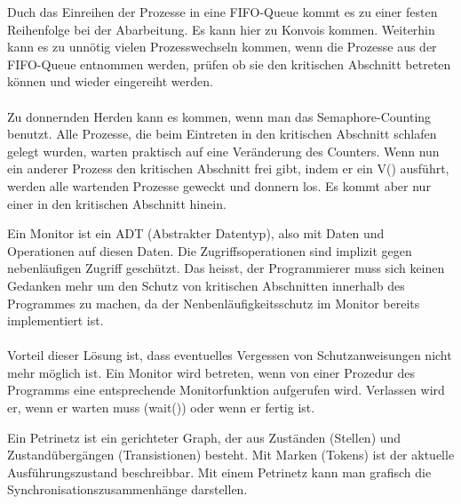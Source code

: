 \begin{answer}
Duch das Einreihen der Prozesse in eine FIFO-Queue kommt es zu einer festen Reihenfolge bei der Abarbeitung. Es kann hier zu Konvois kommen. Weiterhin kann es zu unnötig vielen Prozesswechseln kommen, wenn die Prozesse aus der FIFO-Queue entnommen werden, prüfen ob sie den kritischen Abschnitt betreten können und wieder eingereiht werden.

\paragraph*{}
Zu donnernden Herden kann es kommen, wenn man das Semaphore-Counting benutzt. Alle Prozesse, die beim Eintreten in den kritischen Abschnitt schlafen gelegt wurden, warten praktisch auf eine Veränderung des Counters. Wenn nun ein anderer Prozess den kritischen Abschnitt frei gibt, indem er ein V() ausführt, werden alle wartenden Prozesse geweckt und donnern los. Es kommt aber nur einer in den kritischen Abschnitt hinein.
\end{answer}

\begin{answer}
Ein Monitor ist ein ADT (Abstrakter Datentyp), also mit Daten und Operationen auf diesen Daten. Die Zugriffsoperationen sind implizit gegen nebenläufigen Zugriff geschützt. Das heisst, der Programmierer muss sich keinen Gedanken mehr um den Schutz von kritischen Abschnitten innerhalb des Programmes zu machen, da der Nenbenläufigkeitsschutz im Monitor bereits implementiert
ist.

\paragraph*{}
Vorteil dieser Lösung ist, dass eventuelles Vergessen von Schutzanweisungen nicht mehr möglich ist. Ein Monitor wird betreten, wenn von einer Prozedur des Programms eine entsprechende Monitorfunktion aufgerufen wird. Verlassen wird er, wenn er warten muss (wait()) oder wenn er fertig ist.
\end{answer}

\begin{answer}
Ein Petrinetz ist ein gerichteter Graph, der aus Zuständen (Stellen) und Zustandübergängen
(Transistionen) besteht. Mit Marken (Tokens) ist der aktuelle Ausführungszustand beschreibbar.
Mit einem Petrinetz kann man grafisch die Synchronisationszusammenhänge darstellen.
\end{answer}

